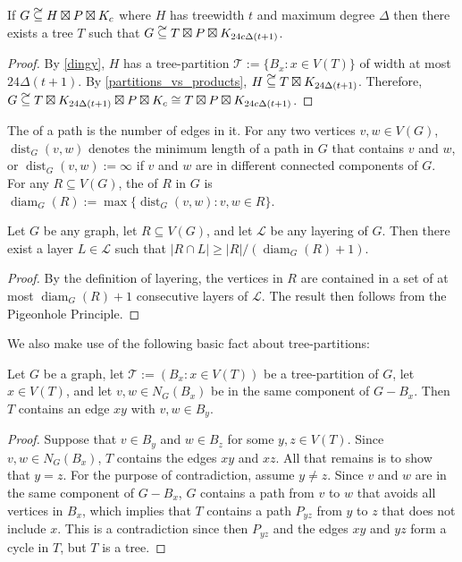 \documentclass{patmorin}
\DeclareMathOperator{\dist}{dist}
\DeclareMathOperator{\diam}{diam}
\newcommand\subsetcong{\mathrel{\text{%
    \setbox0\hbox{$\subseteq$}%
    \rlap{\hbox to \wd0{\hss\hss\hss\raisebox{1.5\height}{$\sim$}\hss}}\box0
}}}
\renewcommand{\ge}{\geqslant}
\begin{document}
\begin{cor}\label{ding_translation}
  If $G\subsetcong H\boxtimes P\boxtimes K_c$ where $H$ has treewidth $t$ and maximum degree $\Delta$ then there exists a tree $T$ such that $G\subsetcong T\boxtimes P\boxtimes K_{24c\Delta (t+1)}$.
\end{cor}

\begin{proof}
  By \cref{dingy}, $H$ has a tree-partition $\mathcal{T}:=\{B_x:x\in V(T)\}$ of width at most $24\Delta (t+1)$. By \cref{partitions_vs_products}, $H \subsetcong T\boxtimes K_{24\Delta (t+1)}$.  Therefore, $G\subsetcong T\boxtimes K_{24\Delta (t+1)}\boxtimes P\boxtimes K_c \cong T\boxtimes P\boxtimes K_{24c\Delta (t+1)}$.
\end{proof}

The  of a path is the number of edges in it. For any two vertices $v,w\in V(G)$, $\dist_G(v,w)$ denotes the minimum length of a path in $G$ that contains $v$ and $w$, or $\dist_G(v,w):=\infty$ if $v$ and $w$ are in different connected components of $G$. For any $R\subseteq V(G)$, the  of $R$ in $G$ is $\diam_G(R):=\max\{\dist_G(v,w):v,w\in R\}$.

\begin{obs}\label{diameter_spread}
  Let $G$ be any graph, let $R\subseteq V(G)$, and let $\mathcal{L}$ be any layering of $G$.  Then there exist a layer $L\in\mathcal{L}$ such that $|R\cap L|\ge |R|/(\diam_G(R)+1)$.
\end{obs}

\begin{proof}
  By the definition of layering, the vertices in $R$ are contained in a set of at most $\diam_G(R)+1$ consecutive layers of $\mathcal{L}$. The result then follows from the Pigeonhole Principle.
\end{proof}


We also make use of the following basic fact about tree-partitions:

\begin{obs}\label{tree_thingy}
  Let $G$ be a graph, let $\mathcal{T}:=(B_x:x\in V(T))$ be a tree-partition of $G$, let $x\in V(T)$, and let $v,w\in N_G(B_x)$ be in the same component of $G-B_x$.  Then $T$ contains an edge $xy$ with $v,w\in B_y$.
\end{obs}

\begin{proof}
  Suppose that $v\in B_y$ and $w\in B_z$ for some $y,z\in V(T)$.  Since $v,w\in N_G(B_x)$, $T$ contains the edges $xy$ and $xz$.  All that remains is to show that $y=z$. For the purpose of contradiction, assume $y\neq z$.  Since $v$ and $w$ are in the same component of $G-B_x$, $G$ contains a path from $v$ to $w$ that avoids all vertices in $B_x$, which implies that $T$ contains a path $P_{yz}$ from $y$ to $z$ that does not include $x$.  This is a contradiction since then $P_{yz}$ and the edges $xy$ and $yz$ form a cycle in $T$, but $T$ is a tree.
\end{proof}
\end{document}
